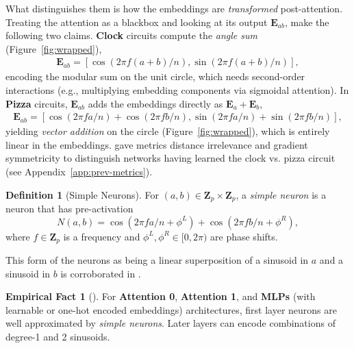 \documentclass{article} %
\theoremstyle{plain}
\theoremstyle{definition}
\newtheorem{definition}[theorem]{Definition}
\newtheorem{empirical fact}[theorem]{Empirical Fact}
\begin{document}
What distinguishes them is how the embeddings are \textit{transformed} post-attention. Treating the attention as a blackbox and looking at its output $\mathbf{E}_{ab}$, \citet{zhong2023the} make the following two claims. \textbf{Clock} circuits compute the \textit{angle sum} (Figure~\ref{fig:wrapped}),
\begin{align}
    \mathbf{E}_{ab}= [\cos(2\pi f(a+b)/n), \sin(2\pi f(a+b)/n)], \label{eq:angle-sum}
\end{align}
encoding the modular sum on the unit circle, which needs second-order interactions (e.g., multiplying embedding components via sigmoidal attention). 
In \textbf{Pizza} circuits, $\mathbf{E}_{ab}$ adds the embeddings directly as $\mathbf{E}_a+\mathbf{E}_b$,
\begin{align}
    \mathbf{E}_{ab} = [\cos(2\pi fa/n)+\cos(2\pi f b/n), \sin(2\pi fa/n)+\sin(2\pi fb/n)],
\end{align}
yielding \textit{vector addition} on the circle (Figure~\ref{fig:wrapped}), which is entirely linear in the embeddings. \citet{zhong2023the} gave metrics distance irrelevance and gradient symmetricity to distinguish networks having learned the clock vs. pizza circuit (see Appendix~\ref{app:prev-metrics}).
\begin{definition}[Simple Neurons]
    For $(a,b) \in \mathbf{Z}_p \times \mathbf{Z}_p$, a \emph{simple neuron} is a neuron  that has pre-activation
    \begin{equation}\label{eq:simple-neuron-model}
    N(a,b)=\cos(2\pi f a/n + \phi^L) + \cos(2\pi f b/n + \phi^R), 
    \end{equation}
    where $f \in \mathbf{Z}_p$ is a frequency and $\phi^L, \phi^R \in [0, 2\pi)$ are phase shifts.
\end{definition}

This form of the neurons as being a linear superposition of a sinusoid in $a$ and a sinusoid in $b$ is corroborated in \cite{gromov2023grokking, morwani2024feature, doshi2023grok, mccracken2025uncoveringuniversalabstractalgorithm, li2025fouriercircuitsneuralnetworks}.


\begin{empirical fact}[\cite{mccracken2025uncoveringuniversalabstractalgorithm}]\label{ef:simple neuron}
For \textbf{Attention 0}, \textbf{Attention 1}, and \textbf{MLPs} (with learnable or one-hot encoded embeddings) architectures, first layer neurons are well approximated by \emph{simple neurons}. Later layers can encode combinations of degree-1 and 2 sinusoids.
\end{empirical fact}
\end{document}
